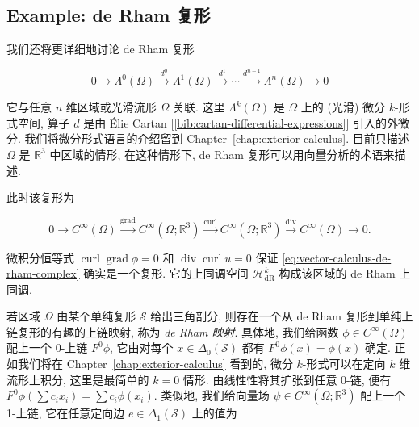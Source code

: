 \subsection{{Example: de Rham 复形}}\label{sec:de-rham-complex}

{我们还将更详细地讨论 de Rham 复形}

\begin{equation}\label{eq:differential-forms-de-rham-complex}
0\to\Lambda^0(\Omega)\xrightarrow{d^0}\Lambda^1(\Omega)\xrightarrow{d^1}\cdots\xrightarrow{d^{n-1}}\Lambda^n(\Omega)\to0
\end{equation}

{它与任意 $n$ 维区域或光滑流形 $\Omega$ 关联. 这里 $\Lambda^k(\Omega)$ 是 $\Omega$ 上的 (光滑) 微分 $k$-形式空间, 算子 $d$ 是由 Élie Cartan [\ref{bib:cartan-differential-expressions}] 引入的外微分. 我们将微分形式语言的介绍留到 Chapter~\ref{chap:exterior-calculus}. 目前只描述 $\Omega$ 是 $\mathbb R^3$ 中区域的情形, 在这种情形下, de Rham 复形可以用向量分析的术语来描述.}

{此时该复形为}

\begin{equation}\label{eq:vector-calculus-de-rham-complex}
0\to C^\infty(\Omega)\xrightarrow{\operatorname{grad}}C^\infty(\Omega;\mathbb R^3)\xrightarrow{\operatorname{curl}}C^\infty(\Omega;\mathbb R^3)\xrightarrow{\operatorname{div}}C^\infty(\Omega)\to0.
\end{equation}

{微积分恒等式 $\operatorname{curl}\operatorname{grad}\phi=0$ 和 $\operatorname{div}\operatorname{curl}u=0$ 保证 \eqref{eq:vector-calculus-de-rham-complex} 确实是一个复形. 它的上同调空间 $\mathcal H^k_{\mathrm{dR}}$ 构成该区域的 de Rham 上同调.}

{若区域 $\Omega$ 由某个单纯复形 $\mathcal S$ 给出三角剖分, 则存在一个从 de Rham 复形到单纯上链复形的有趣的上链映射, 称为 \emph{de Rham 映射}. 具体地, 我们给函数 $\phi\in C^\infty(\Omega)$ 配上一个 0-上链 $F^0\phi$, 它由对每个 $x\in\Delta_0(\mathcal S)$ 都有 $F^0\phi(x)=\phi(x)$ 确定. 正如我们将在 Chapter~\ref{chap:exterior-calculus} 看到的, 微分 $k$-形式可以在定向 $k$ 维流形上积分, 这里是最简单的 $k=0$ 情形. 由线性性将其扩张到任意 0-链, 便有 $F^0\phi(\sum c_ix_i)=\sum c_i\phi(x_i)$. 类似地, 我们给向量场 $\psi\in C^\infty(\Omega;\mathbb R^3)$ 配上一个 1-上链, 它在任意定向边 $e\in\Delta_1(\mathcal S)$ 上的值为}

